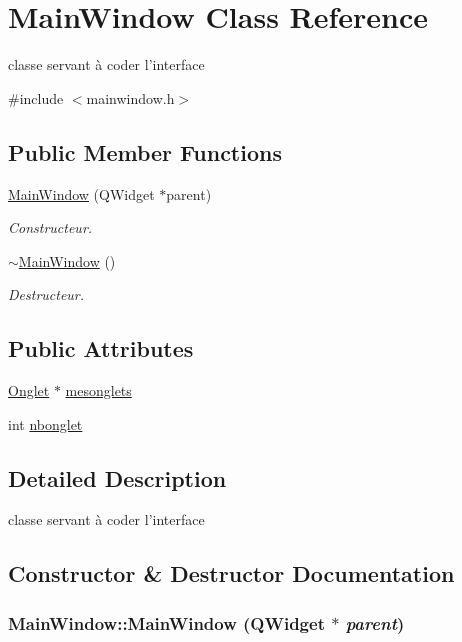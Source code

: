 \hypertarget{classMainWindow}{
\section{MainWindow Class Reference}
\label{classMainWindow}
}


classe servant à coder l'interface  




{\ttfamily \#include $<$mainwindow.h$>$}

\subsection*{Public Member Functions}
\begin{DoxyCompactItemize}
\item 
\hyperlink{classMainWindow_ae7344f408a563bc6d9b1acd225da52cb}{MainWindow} (QWidget $\ast$parent)
\begin{DoxyCompactList}\small\item\em Constructeur. \item\end{DoxyCompactList}\item 
\hyperlink{classMainWindow_ae98d00a93bc118200eeef9f9bba1dba7}{$\sim$MainWindow} ()
\begin{DoxyCompactList}\small\item\em Destructeur. \item\end{DoxyCompactList}\end{DoxyCompactItemize}
\subsection*{Public Attributes}
\begin{DoxyCompactItemize}
\item 
\hyperlink{classOnglet}{Onglet} $\ast$ \hyperlink{classMainWindow_a72524c4f5e0983c2aac8004226754b55}{mesonglets}
\item 
int \hyperlink{classMainWindow_aaa1984965e18d96e589cdc2216212656}{nbonglet}
\end{DoxyCompactItemize}


\subsection{Detailed Description}
classe servant à coder l'interface 

\subsection{Constructor \& Destructor Documentation}
\hypertarget{classMainWindow_ae7344f408a563bc6d9b1acd225da52cb}{
\subsubsection[{MainWindow}]{\setlength{\rightskip}{0pt plus 5cm}MainWindow::MainWindow (QWidget $\ast$ {\em parent})}}
\label{classMainWindow_ae7344f408a563bc6d9b1acd225da52cb}



